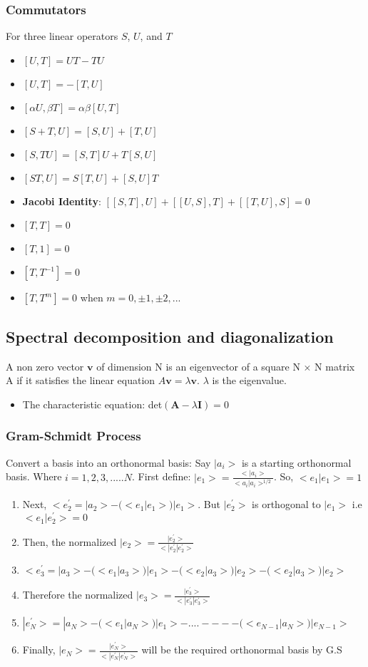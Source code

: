 \documentclass[]{article}
\begin{document}
\subsubsection{Commutators}
For three linear operators $S$, $U$, and $T$
\begin{itemize}
    \item $[U,T] = UT - TU$
    \item $[U,T] = -[T,U]$
    \item $[\alpha{U}, \beta{T}] = \alpha\beta[U,T]$
    \item $[S+T, U] = [S,U] + [T,U]$
    \item $[S,TU] = [S,T]U + T[S,U]$
    \item $[ST,U] = S[T,U] + [S,U]T$
    \item \textbf{Jacobi Identity}: $[[S,T], U] + [[U,S],T] + [[T,U],S] = 0$
    \item $[T,T] = 0$
    \item $[T,1] = 0$
    \item $[T,T^{-1}] = 0$
    \item $[T,T^m] = 0$ when $m=0,±1,±2,...$
\end{itemize}

\subsection{Spectral decomposition and diagonalization}
A non zero vector $\textbf{v}$ of dimension N is an eigenvector of a square N × N matrix A if it satisfies the linear equation $A\textbf{v}=\lambda \textbf{v}$. $\lambda$ is the eigenvalue.
\begin{itemize}
    \item The characteristic equation: det$(\textbf{A}-\lambda \textbf{I})=0$
\end{itemize}
\subsubsection{Gram-Schmidt Process}
Convert a basis into an orthonormal basis:
Say $|a_i>$ is a starting orthonormal basis. Where $i=1,2,3,.....N$. First define: $|e_1>= \frac{<|a_i>}{<a_i|a_i>^{1/2}}$. So, $<e_1|e_1>=1$
\begin{enumerate}
   
    \item Next, $<e_2^{'}=|a_2>-(<e_1|e_1>)|e_1>$. But $|e_2^{'}>$ is orthogonal to $|e_1>$ i.e $<e_1|e_2^{'}>=0$
    \item Then, the normalized $|e_2>= \frac{|e_2^{'}>}{<|e_2^{'}|e_2^{'}>}$ 
    \item  $<e_3^{'}=|a_3>-(<e_1|a_3>)|e_1>-(<e_2|a_3>)|e_2>-(<e_2|a_3>)|e_2>$
    \item Therefore the normalized $|e_3>= \frac{|e_3^{'}>}{<|e_3^{'}|e_3^{'}>}$
    \item $|e_N^{'}>=|a_N>-(<e_1|a_N>)|e_1>-....----(<e_{N-1}|a_N>)|e_{N-1}>$
    \item Finally, $|e_N>= \frac{|e_N^{'}>}{<|e_N^{'}|e_N^{'}>}$ will be the required orthonormal basis by G.S 
    
\end{enumerate}
\end{document}
